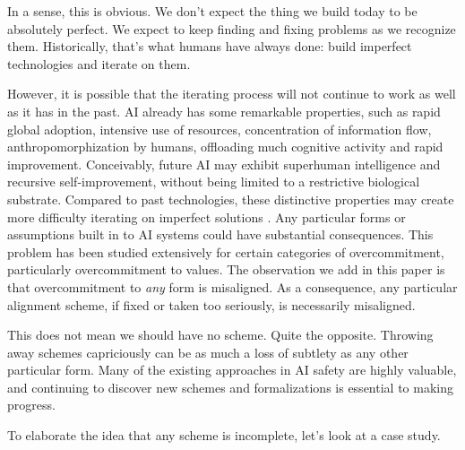 \documentclass[12pt]{article}
\begin{document}

In a sense, this is obvious. We don't expect the thing we build today to be absolutely perfect. We expect to keep finding and fixing problems as we recognize them. Historically, that's what humans have always done: build imperfect technologies and iterate on them.

However, it is possible that the iterating process will not continue to work as well as it has in the past. AI already has some remarkable properties, such as rapid global adoption, intensive use of resources, concentration of information flow, anthropomorphization by humans, offloading much cognitive activity and rapid improvement. Conceivably, future AI may exhibit superhuman intelligence and recursive self-improvement, without being limited to a restrictive biological substrate. Compared to past technologies, these distinctive properties may create more difficulty iterating on imperfect solutions \citep{bostrom2014superintelligence}. Any particular forms or assumptions built in to AI systems could have substantial consequences. This problem has been studied extensively for certain categories of overcommitment, particularly overcommitment to values. The observation we add in this paper is that overcommitment to \textit{any} form is misaligned. As a consequence, any particular alignment scheme, if fixed or taken too seriously, is necessarily misaligned. 

This does not mean we should have no scheme. Quite the opposite. Throwing away schemes capriciously can be as much a loss of subtlety as any other particular form. Many of the existing approaches in AI safety are highly valuable, and continuing to discover new schemes and formalizations is essential to making progress. 

To elaborate the idea that any scheme is incomplete, let's look at a case study.
\end{document}
